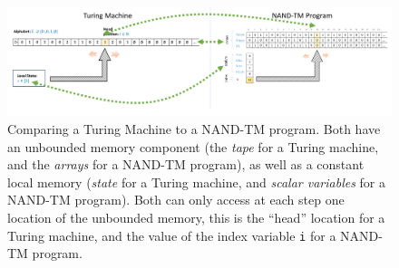 \begin{figure}
\centering
\includegraphics[width=\textwidth, height=0.25\paperheight, keepaspectratio]{../figure/turingmachinevsnandtm.png}
\caption{Comparing a Turing Machine to a NAND-TM program. Both have an
unbounded memory component (the \emph{tape} for a Turing machine, and
the \emph{arrays} for a NAND-TM program), as well as a constant local
memory (\emph{state} for a Turing machine, and \emph{scalar variables}
for a NAND-TM program). Both can only access at each step one location
of the unbounded memory, this is the ``head'' location for a Turing
machine, and the value of the index variable \texttt{i} for a NAND-TM
program.}
\label{tmvsnandppfig}
\end{figure}

